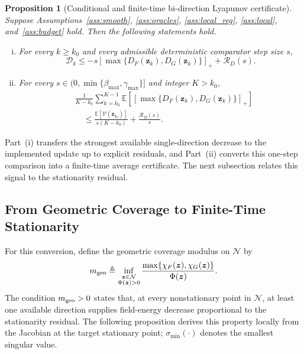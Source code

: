 \documentclass[journal]{IEEEtran}
\newtheorem{proposition}{Proposition}
\theoremstyle{remark}
\newcommand{\E}{\mathbb{E}}
\newcommand{\cN}{\mathcal{N}}
\newcommand{\bz}{\boldsymbol{z}}
\newcommand{\Vk}{\mathcal{V}}
\begin{document}
	\begin{proposition}[Conditional and finite-time bi-direction Lyapunov certificate]\label{prop:directional_certificate}
		Suppose Assumptions~\ref{ass:smooth}, \ref{ass:oracles}, \ref{ass:local_reg}, \ref{ass:local}, and~\ref{ass:budget} hold.
		Then the following statements hold.
		\begin{enumerate}[(i)]
		\item For every $k\ge k_0$ and every admissible deterministic comparator step size $s$,
			\begin{equation}\label{eq:cond_drift}
				\mathscr D_k
				\le
				-s\left[\max\{D_F(\bz_k),D_G(\bz_k)\}\right]_+
				+\mathcal R_D(s).
			\end{equation}
			\item For every $s\in(0,\min\{\beta_{\max},\gamma_{\max}\}]$ and integer $K>k_0$,
			\begin{equation}\label{eq:directional_certificate}
				\begin{aligned}
					&\frac{1}{K-k_0}
					\sum_{k=k_0}^{K-1}
					\E\!\left[\left[\max\{D_F(\bz_k),D_G(\bz_k)\}\right]_+\right]
					\\
					&\quad\le
					\frac{\E[\Vk(\bz_{k_0})]}{s(K-k_0)}
					+\frac{\mathcal R_D(s)}{s}.
				\end{aligned}
			\end{equation}
		\end{enumerate}
	\end{proposition}
	
	Part~(i) transfers the strongest available single-direction decrease to the implemented update up to explicit residuals, and Part~(ii) converts this one-step comparison into a finite-time average certificate.
	The next subsection relates this signal to the stationarity residual.
	
	\subsection{From Geometric Coverage to Finite-Time Stationarity}\label{subsec:ergodic}
	
	For this conversion, define the geometric coverage modulus on $\cN$ by
	\begin{equation}\label{eq:coverage_modulus}
		m_{\rm geo}
		\triangleq
		\inf_{\substack{\bz\in\cN\\\Phi(\bz)>0}}
		\frac{\max\{\chi_F(\bz),\chi_G(\bz)\}}{\Phi(\bz)}.
	\end{equation}
	The condition $m_{\rm geo}>0$ states that, at every nonstationary point in $\cN$, at least one available direction supplies field-energy decrease proportional to the stationarity residual.
	The following proposition derives this property locally from the Jacobian at the target stationary point; $\sigma_{\min}(\cdot)$ denotes the smallest singular value.
	
\end{document}
